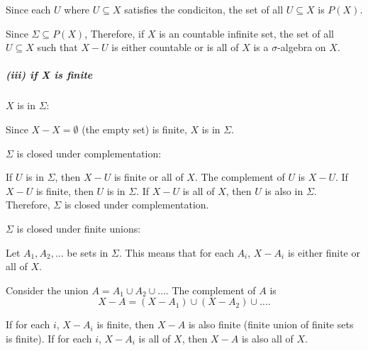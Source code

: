 \documentclass[12pt]{article}
\begin{document}
\par \hspace*{1em}Since each \( U \) where \( U \subseteq X \) satisfies the condiciton, the set of all \( U \subseteq X \) is \( P(X) \). \\
\par \hspace*{1em}Since \( \Sigma \subseteq P(X) \), Therefore, if \( X \) is an countable infinite set, the set of all \( U \subseteq X \) such that \( X - U \) is either countable or is all of \(X\) is a \( \sigma \)-algebra on \( X \).
\subparagraph{(iii) if X is finite}

\par \hspace*{1em}$X$ is in $\Sigma$:

\par \hspace*{1em}Since $X - X = \emptyset$ (the empty set) is finite, $X$ is in $\Sigma$.

\par \hspace*{1em}$\Sigma$ is closed under complementation:

\par \hspace*{1em}If $U$ is in $\Sigma$, then $X - U$ is finite or all of $X$. The complement of $U$ is $X - U$. If $X - U$ is finite, then $U$ is in $\Sigma$. If $X - U$ is all of $X$, then $U$ is also in $\Sigma$. Therefore, $\Sigma$ is closed under complementation.

\par \hspace*{1em}$\Sigma$ is closed under finite unions:

\par \hspace*{1em}Let $A_1, A_2, \ldots$ be sets in $\Sigma$. This means that for each $A_i$, $X - A_i$ is either finite or all of $X$.

\par \hspace*{1em}Consider the union $A = A_1 \cup A_2 \cup \ldots$. The complement of $A$ is
\[
X - A = (X - A_1) \cup (X - A_2) \cup \ldots.
\]

\par \hspace*{1em}If for each $i$, $X - A_i$ is finite, then $X - A$ is also finite (finite union of finite sets is finite). If for each $i$, $X - A_i$ is all of $X$, then $X - A$ is also all of $X$.
\end{document}
